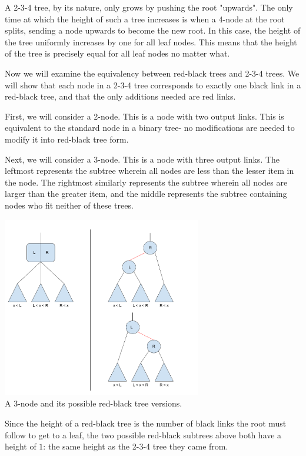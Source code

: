 \documentclass[12pt]{amsart}
\begin{document}
    A 2-3-4 tree, by its nature, only grows by pushing the root
    "upwards". The only time at which the height of such a tree
    increases is when a 4-node at the root splits, sending a
    node upwards to become the new root. In this case, the
    height of the tree uniformly increases by one for all leaf
    nodes. This means that the height of the tree is precisely
    equal for all leaf nodes no matter what.

    Now we will examine the equivalency between red-black trees
    and 2-3-4 trees. We will show that each node in a 2-3-4 tree
    corresponds to exactly one black link in a red-black tree,
    and that the only additions needed are red links.

    First, we will consider a 2-node. This is a node with two
    output links. This is equivalent to the standard node in a
    binary tree- no modifications are needed to modify it into
    red-black tree form.

    Next, we will consider a 3-node. This is a node with three
    output links. The leftmost represents the subtree wherein
    all nodes are less than the lesser item in the node. The
    rightmost similarly represents the subtree wherein all nodes
    are larger than the greater item, and the middle represents
    the subtree containing nodes who fit neither of these trees.

\begin{center}
    \includegraphics[width=0.65\textwidth]{rb_tree_1} \\
    A 3-node and its possible red-black tree versions. \\
    \vskip 1cm
\end{center}

    Since the height of a red-black tree is the number of black
    links the root must follow to get to a leaf, the two
    possible red-black subtrees above both have a height of $1$:
    the same height as the 2-3-4 tree they came from.
\end{document}
